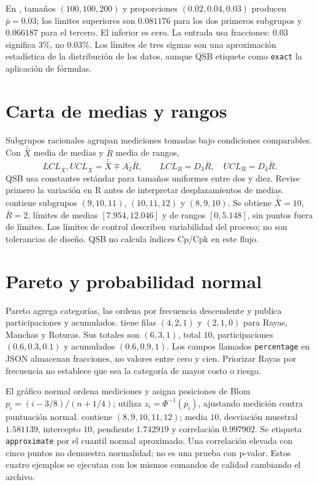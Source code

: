 En , tamaños
\((100,100,200)\) y proporciones \((0.02,0.04,0.03)\) producen
\(\bar p=0.03\); los límites superiores son \(0.081176\) para los dos
primeros subgrupos y \(0.066187\) para el tercero. El inferior es cero.
La entrada usa fracciones: \(0.03\) significa \(3\%\), no \(0.03\%\).
Los límites de tres sigmas son una aproximación estadística de la distribución
de los datos, aunque QSB etiquete como \texttt{exact} la aplicación de fórmulas.

\section{Carta de medias y rangos}
Subgrupos racionales agrupan mediciones tomadas bajo condiciones comparables.
Con \(\bar{\bar X}\) media de medias y \(\bar R\) media de rangos,
\[
 LCL_{\bar X},UCL_{\bar X}=\bar{\bar X}\mp A_2\bar R,\qquad
 LCL_R=D_3\bar R,\quad UCL_R=D_4\bar R.
\]
QSB usa constantes estándar para tamaños uniformes entre dos y diez.
Revise primero la variación en R antes de interpretar desplazamientos de medias.
 contiene subgrupos \((9,10,11)\),
\((10,11,12)\) y \((8,9,10)\). Se obtiene \(\bar{\bar X}=10\),
\(\bar R=2\), límites de medias \([7.954,12.046]\) y de rangos
\([0,5.148]\), sin puntos fuera de límites. Los límites de control describen
variabilidad del proceso; no son tolerancias de diseño. QSB no calcula índices
Cp/Cpk en este flujo.

\section{Pareto y probabilidad normal}
Pareto agrega categorías, las ordena por frecuencia descendente y publica
participaciones y acumulados.  tiene filas
\((4,2,1)\) y \((2,1,0)\) para Rayas, Manchas y Roturas. Sus totales son
\((6,3,1)\), total \(10\), participaciones \((0.6,0.3,0.1)\) y acumulados
\((0.6,0.9,1)\). Los campos llamados \texttt{percentage} en JSON almacenan
fracciones, no valores entre cero y cien. Priorizar Rayas por frecuencia no
establece que sea la categoría de mayor costo o riesgo.

El gráfico normal ordena mediciones y asigna posiciones de Blom
\(p_i=(i-3/8)/(n+1/4)\); utiliza \(z_i=\Phi^{-1}(p_i)\), ajustando
medición contra puntuación normal.  contiene
\((8,9,10,11,12)\); media \(10\), desviación muestral \(1.581139\),
intercepto \(10\), pendiente \(1.742919\) y correlación \(0.997902\).
Se etiqueta \texttt{approximate} por el cuantil normal aproximado. Una
correlación elevada con cinco puntos no demuestra normalidad; no es una prueba
con p-valor. Estos cuatro ejemplos se ejecutan con los mismos comandos de
calidad cambiando el archivo.

